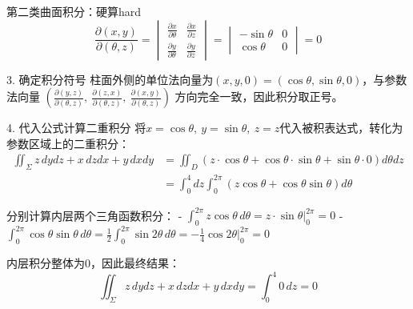 \documentclass[UTF8,zihao=-4,openany]{ctexbook}
\begin{document}
\begin{example}{第二类曲面积分：硬算}{hard}
$$
\frac{\partial(x,y)}{\partial(\theta,z)} = \begin{vmatrix}
\frac{\partial x}{\partial \theta} & \frac{\partial x}{\partial z} \\
\frac{\partial y}{\partial \theta} & \frac{\partial y}{\partial z}
\end{vmatrix} = \begin{vmatrix}
-\sin\theta & 0 \\
\cos\theta & 0
\end{vmatrix} = 0
$$

3. 确定积分符号
柱面外侧的单位法向量为$(x, y, 0) = (\cos\theta, \sin\theta, 0)$，与参数法向量
$\left( \frac{\partial(y,z)}{\partial(\theta,z)},\ \frac{\partial(z,x)}{\partial(\theta,z)},\ \frac{\partial(x,y)}{\partial(\theta,z)} \right)$
方向完全一致，因此积分取正号。

4. 代入公式计算二重积分
将$x = \cos\theta,\ y = \sin\theta,\ z = z$代入被积表达式，转化为参数区域上的二重积分：
$$
\begin{aligned}
\iint_\Sigma z \, dydz + x \, dzdx + y \, dxdy
&= \iint_D \left( z \cdot \cos\theta + \cos\theta \cdot \sin\theta + \sin\theta \cdot 0 \right) d\theta dz \\
&= \int_{0}^{4} dz \int_{0}^{2\pi} \left( z \cos\theta + \cos\theta \sin\theta \right) d\theta
\end{aligned}
$$

分别计算内层两个三角函数积分：
- $\displaystyle \int_{0}^{2\pi} z \cos\theta \, d\theta = z \cdot \sin\theta \bigg|_{0}^{2\pi} = 0$
- $\displaystyle \int_{0}^{2\pi} \cos\theta \sin\theta \, d\theta = \frac{1}{2} \int_{0}^{2\pi} \sin2\theta \, d\theta = -\frac{1}{4} \cos2\theta \bigg|_{0}^{2\pi} = 0$

内层积分整体为$0$，因此最终结果：
$$
\iint_\Sigma z \, dydz + x \, dzdx + y \, dxdy = \int_{0}^{4} 0 \, dz = 0
$$
\end{example}
\end{document}
